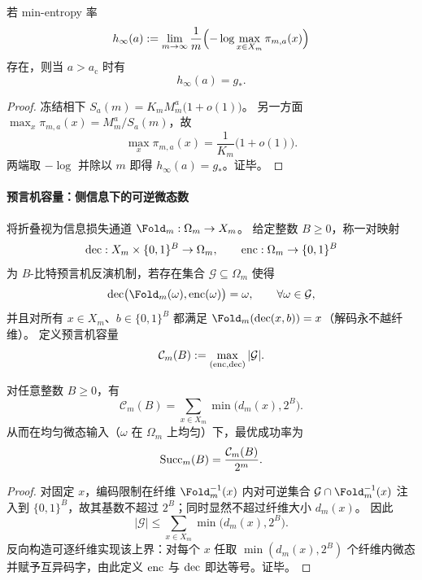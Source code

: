 \begin{corollary}[冻结相的基态简并指数识别]\label{cor:fold-escort-minentropy-rate}
若 min-entropy 率
\[
h_\infty(a):=\lim_{m\to\infty}\frac{1}{m}\Bigl(-\log\max_{x\in X_m}\pi_{m,a}(x)\Bigr)
\]
存在，则当 \(a>a_{\mathrm c}\) 时有
\[
h_\infty(a)=g_*.
\]
\end{corollary}

\begin{proof}
冻结相下 \(S_a(m)=K_mM_m^a\bigl(1+o(1)\bigr)\)。
另一方面 \(\max_x\pi_{m,a}(x)=M_m^a/S_a(m)\)，故
\[
\max_x\pi_{m,a}(x)=\frac{1}{K_m}\bigl(1+o(1)\bigr).
\]
两端取 \(-\log\) 并除以 \(m\) 即得 \(h_\infty(a)=g_*\)。证毕。
\end{proof}

\paragraph{预言机容量：侧信息下的可逆微态数}
将折叠视为信息损失通道 \(\Fold_m:\Omega_m\to X_m\)。
给定整数 \(B\ge 0\)，称一对映射
\[
{\rm dec}:X_m\times\{0,1\}^B\to\Omega_m,\qquad
{\rm enc}:\Omega_m\to\{0,1\}^B
\]
为 \(B\)-比特预言机反演机制，若存在集合 \(\mathcal{G}\subseteq\Omega_m\) 使得
\[
{\rm dec}\bigl(\Fold_m(\omega),{\rm enc}(\omega)\bigr)=\omega,\qquad \forall \omega\in\mathcal{G},
\]
并且对所有 \(x\in X_m\)、\(b\in\{0,1\}^B\) 都满足 \(\Fold_m({\rm dec}(x,b))=x\)（解码永不越纤维）。
定义预言机容量
\[
\mathcal{C}_m(B):=\max_{({\rm enc},{\rm dec})}|\mathcal{G}|.
\]

\begin{theorem}[预言机容量的闭式表达]\label{thm:fold-oracle-capacity-closed-form}
对任意整数 \(B\ge 0\)，有
\[
\mathcal{C}_m(B)=\sum_{x\in X_m}\min\bigl(d_m(x),2^B\bigr).
\]
从而在均匀微态输入（\(\omega\) 在 \(\Omega_m\) 上均匀）下，最优成功率为
\[
{\rm Succ}_m(B)=\frac{\mathcal{C}_m(B)}{2^m}.
\]
\end{theorem}

\begin{proof}
对固定 \(x\)，编码限制在纤维 \(\Fold_m^{-1}(x)\) 内对可逆集合 \(\mathcal{G}\cap \Fold_m^{-1}(x)\) 注入到 \(\{0,1\}^B\)，故其基数不超过 \(2^B\)；同时显然不超过纤维大小 \(d_m(x)\)。
因此
\[
|\mathcal{G}|\le \sum_{x\in X_m}\min\bigl(d_m(x),2^B\bigr).
\]
反向构造可逐纤维实现该上界：对每个 \(x\) 任取 \(\min(d_m(x),2^B)\) 个纤维内微态并赋予互异码字，由此定义 \({\rm enc}\) 与 \({\rm dec}\) 即达等号。证毕。
\end{proof}

